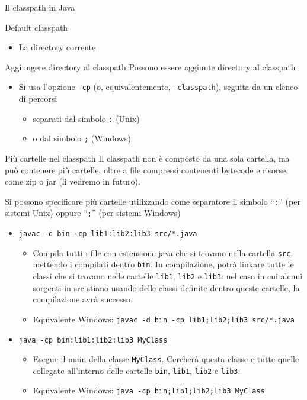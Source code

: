 \documentclass[presentation]{beamer}
\begin{document}
\begin{frame}[allowframebreaks]{Il classpath in Java}
\begin{block}{Default classpath}
\begin{itemize}
\begin{itemize}
				\item Contengono ad esempio \texttt{java.lang.Math}
			\end{itemize}
			\item La directory corrente
		\end{itemize}
	\end{block}
	\begin{block}{Aggiungere directory al classpath}
		Possono essere aggiunte directory al classpath
		\begin{itemize}
			\item Si usa l'opzione \texttt{-cp} (o, equivalentemente, \texttt{-classpath}), seguita da un elenco di percorsi
			\begin{itemize}
				\item separati dal simbolo \texttt{:} (Unix)
				\item o dal simbolo \texttt{;} (Windows)
			\end{itemize}
		\end{itemize}
	\end{block}
\end{frame}

\begin{frame}{Più cartelle nel classpath}
	Il classpath non è composto da una sola cartella, ma può contenere più cartelle, oltre a file compressi contenenti bytecode e risorse, come zip o jar (li vedremo in futuro).
	\begin{block}{}
		Si possono specificare più cartelle utilizzando come separatore il simbolo ``\texttt{:}'' (per sistemi Unix) oppure ``\texttt{;}'' (per sistemi Windows)
		\begin{itemize}
			\item \texttt{javac -d bin -cp lib1:lib2:lib3 src/*.java}
			\begin{itemize}
				\item Compila tutti i file con estensione java che si trovano nella cartella \texttt{src}, mettendo i compilati dentro \texttt{bin}. In compilazione, potrà linkare tutte le classi che si trovano nelle cartelle \texttt{lib1}, \texttt{lib2} e \texttt{lib3}: nel caso in cui alcuni sorgenti in src stiano usando delle classi definite dentro queste cartelle, la compilazione avrà successo.
				\item \scriptsize{Equivalente Windows: \texttt{javac -d bin -cp lib1;lib2;lib3 src/*.java}}
		\end{itemize}
			\item \texttt{java -cp bin:lib1:lib2:lib3 MyClass}
			\begin{itemize}
				\item Esegue il main della classe \texttt{MyClass}. Cercherà questa classe e tutte quelle collegate all'interno delle cartelle \texttt{bin}, \texttt{lib1}, \texttt{lib2} e \texttt{lib3}.
				\item \scriptsize{Equivalente Windows: \texttt{java -cp bin;lib1;lib2;lib3 MyClass}}
			\end{itemize}
		\end{itemize}
	\end{block}
\end{frame}
\end{document}
